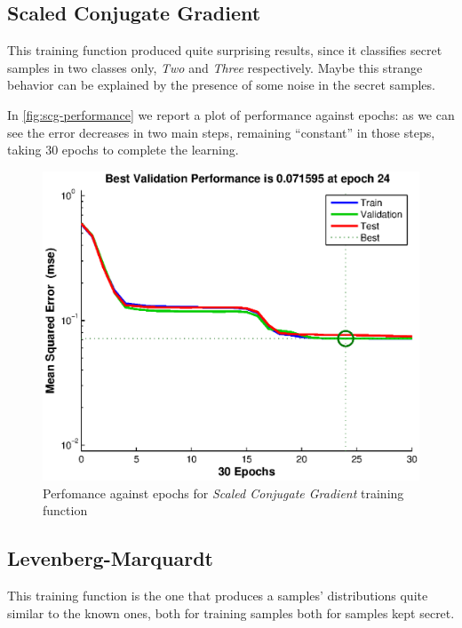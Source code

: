 \documentclass[10pt,a4paper]{article}
\begin{document}
    \subsection{Scaled Conjugate Gradient}

    This training function produced quite surprising results, since it classifies secret
    samples in two classes only, \emph{Two} and \emph{Three} respectively. Maybe this strange behavior
    can be explained by the presence of some noise in the secret samples.

    In \autoref{fig:scg-performance} we report a plot of performance against epochs: as we can
    see the error decreases in two main steps, remaining ``constant'' in those steps,
     taking $30$ epochs to complete the learning.

    \begin{figure}
    \centering
    \includegraphics[scale=0.7]{eps/scg-performance.eps}
    \caption{Perfomance against epochs for \emph{Scaled Conjugate Gradient} training function}
    \label{fig:scg-performance}
    \end{figure}

    \subsection{Levenberg-Marquardt}

    This training function is the one that produces a samples' distributions quite similar 
    to the known ones, both for training samples both for samples kept secret. 
\end{document}
